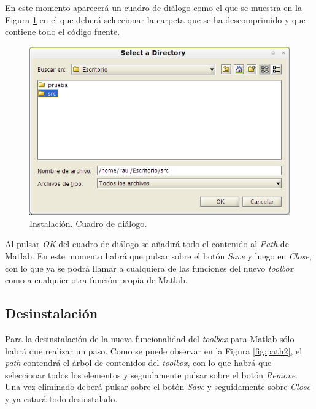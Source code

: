 			En este momento aparecerá un cuadro de diálogo como el que se muestra en la Figura \ref{fig:dialog} en el que deberá seleccionar la carpeta que se ha descomprimido y que contiene todo el código fuente.\\
			
			\begin{figure}[htbp]
				\centering
				\includegraphics[scale=0.6]{img/dialog.png}
				\caption{Instalación. Cuadro de diálogo.}
				\label{fig:dialog}
			\end{figure}
			
			Al pulsar \textit{OK} del cuadro de diálogo se añadirá todo el contenido al \textit{Path} de Matlab. En este momento habrá que pulsar sobre el botón \textit{Save} y luego en \textit{Close}, con lo que ya se podrá llamar a cualquiera de las funciones del nuevo \textit{toolbox} como a cualquier otra función propia de Matlab.
		
		\subsection{Desinstalación}
		
			Para la desinstalación de la nueva funcionalidad del \textit{toolbox} para Matlab sólo habrá que realizar un paso. Como se puede observar en la Figura \ref{fig:path2}, el \textit{path} contendrá el árbol de contenidos del \textit{toolbox}, con lo que habrá que seleccionar todos los elementos y seguidamente pulsar sobre el botón \textit{Remove}. Una vez eliminado deberá pulsar sobre el botón \textit{Save} y seguidamente sobre \textit{Close} y ya estará todo desinstalado.
			
